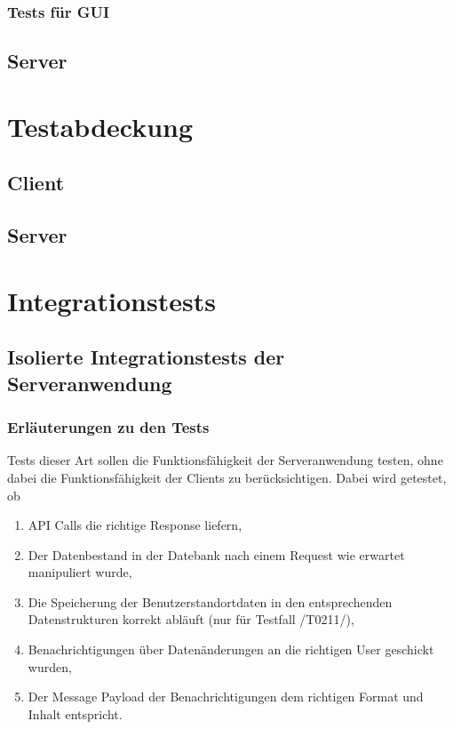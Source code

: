 \documentclass[11pt,a4paper]{scrartcl}
\begin{document}
\subsubsection{Tests für GUI}

\newpage

\subsection{Server}

\newpage

\section{Testabdeckung}

\subsection{Client}

\subsection{Server}

\newpage

\section{Integrationstests}
\subsection{Isolierte Integrationstests der Serveranwendung}\label{ServerIT}
\subsubsection{Erläuterungen zu den Tests}
Tests dieser Art sollen die Funktionsfähigkeit der Serveranwendung testen, ohne dabei die Funktionsfähigkeit der Clients zu berücksichtigen. Dabei wird getestet, ob
\begin{enumerate}
	\item API Calls die richtige Response liefern,
	\item Der Datenbestand in der Datebank nach einem Request wie erwartet manipuliert wurde,
	\item Die Speicherung der Benutzerstandortdaten in den entsprechenden Datenstrukturen korrekt abläuft (nur für Testfall /T0211/),
	\item Benachrichtigungen über Datenänderungen an die richtigen User geschickt wurden,
	\item Der Message Payload der Benachrichtigungen dem richtigen Format und Inhalt entspricht.
\end{enumerate}
\end{document}
